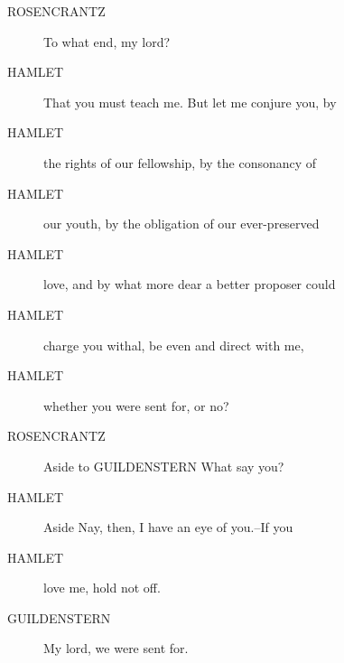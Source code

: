 \documentclass{article}
\begin{document}
\begin{description}
            
\item[ROSENCRANTZ] To what end, my lord?
\end{description}
          
\begin{description}
            
\item[HAMLET] That you must teach me. But let me conjure you, by
\item[HAMLET] the rights of our fellowship, by the consonancy of
\item[HAMLET] our youth, by the obligation of our ever-preserved
\item[HAMLET] love, and by what more dear a better proposer could
\item[HAMLET] charge you withal, be even and direct with me,
\item[HAMLET] whether you were sent for, or no?
\end{description}
          
\begin{description}
            
\item[ROSENCRANTZ] 
               Aside to GUILDENSTERN  What say you?
\end{description}
          
\begin{description}
            
\item[HAMLET] 
               Aside  Nay, then, I have an eye of you.--If you
\item[HAMLET] love me, hold not off.
\end{description}
          
\begin{description}
            
\item[GUILDENSTERN] My lord, we were sent for.
\end{description}
          
\end{document}
